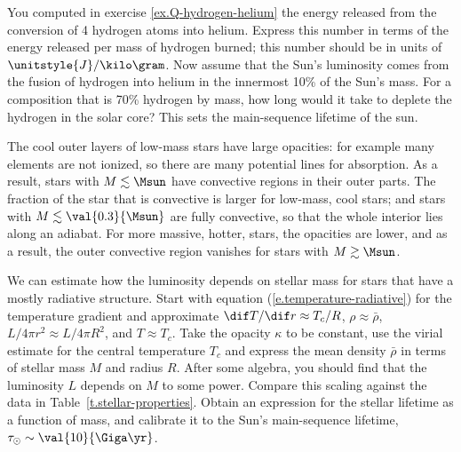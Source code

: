\begin{exercisebox}
\label{ex.nuclear-burning-timescale}
You computed in exercise \ref{ex.Q-hydrogen-helium} the energy released from the conversion of 4 hydrogen atoms into helium. Express this number in terms of the energy released per mass of hydrogen burned; this number should be in units of $\unitstyle{J}/\kilo\gram$. Now assume that the Sun's luminosity comes from the fusion of hydrogen into helium in the innermost 10\% of the Sun's mass. For a composition that is 70\% hydrogen by mass, how long would it take to deplete the hydrogen in the solar core? This sets the main-sequence lifetime of the sun.
\end{exercisebox}

The cool outer layers of low-mass stars have large opacities: for example many elements are not ionized, so there are many potential lines for absorption. As a result, stars with $M\lesssim\Msun$ have convective regions in their outer parts. The fraction of the star that is convective is larger for low-mass, cool stars; and stars with $M \lesssim\val{0.3}{\Msun}$ are fully convective, so that the whole interior lies along an adiabat. For more massive, hotter, stars, the opacities are lower, and as a result, the outer convective region vanishes for stars with $M\gtrsim\Msun$.

\begin{exercisebox}
\label{ex.mass-luminosity-relation}
We can estimate how the luminosity depends on stellar mass for stars that have a mostly radiative structure. Start with equation (\ref{e.temperature-radiative}) for the temperature gradient and approximate $\dif T/\dif r \approx T_{c}/R$, $\rho \approx \bar{\rho}$, $L/4\pi r^{2} \approx L/4\pi R^{2}$, and $T\approx T_{c}$. Take the opacity $\kappa$ to be constant,  use the virial estimate for the central temperature $T_{c}$ and express the mean density $\bar{\rho}$ in terms of stellar mass $M$ and radius $R$. After some algebra, you should find that the luminosity $L$ depends on $M$ to some power. Compare this scaling against the data in Table~\ref{t.stellar-properties}. Obtain an expression for the stellar lifetime as a function of mass, and calibrate it to the Sun's main-sequence lifetime, $\tau_{\odot}\sim\val{10}{\Giga\yr}$.
\end{exercisebox}

